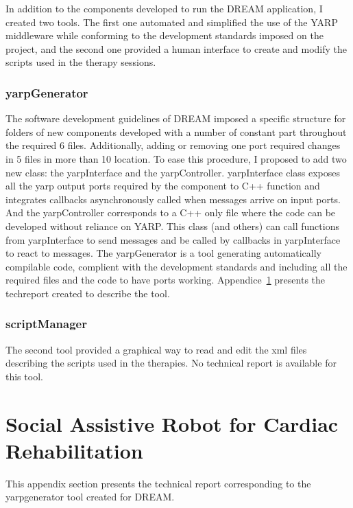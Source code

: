 In addition to the components developed to run the DREAM application, I created two tools. The first one automated and simplified the use of the YARP middleware while conforming to the development standards imposed on the project, and the second one provided a human interface to create and modify the scripts used in the therapy sessions.

\subsection{yarpGenerator}

The software development guidelines of DREAM imposed a specific structure for folders of new components developed with a number of constant part throughout the required 6 files. Additionally, adding or removing one port required changes in 5 files in more than 10 location. To ease this procedure, I proposed to add two new class: the yarpInterface and the yarpController. yarpInterface class exposes all the yarp output ports required by the component to C++ function and integrates callbacks asynchronously called when messages arrive on input ports. And the yarpController corresponds to a C++ only file where the code can be developed without reliance on YARP. This class (and others) can call functions from yarpInterface to send messages and be called by callbacks in yarpInterface to react to messages. The yarpGenerator is a tool generating automatically compilable code, complient with the development standards and including all the required files and the code to have ports working. Appendice~\ref{app:yarpgenerator} presents the techreport created to describe the tool.

\subsection{scriptManager}

The second tool provided a graphical way to read and edit the xml files describing the scripts used in the therapies. No technical report is available for this tool.

\cleartooddpage
\chapter{Social Assistive Robot for Cardiac Rehabilitation} \label{app:yarpgenerator}
This appendix section presents the technical report corresponding to the yarpgenerator tool created for DREAM.

